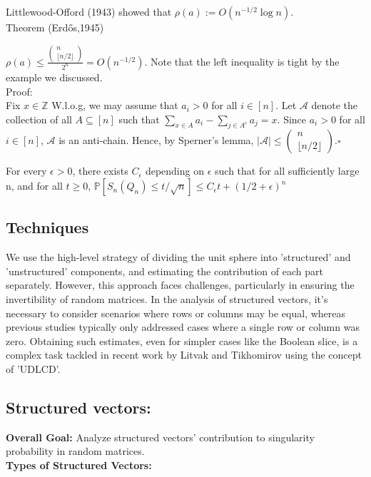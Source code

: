 \documentclass{article}
\begin{document}
Littlewood-Offord (1943) showed that $\rho(a):= O(n^{-1/2}\log{n})$.\\
Theorem (Erd\H{o}s,1945)

$\rho(a) \leq \frac{\left( \begin{array}{c} n \\ {\lfloor n/2 \rfloor} \end{array} \right)
    }{2^n} = O(n^{-1/2})$.
Note that the left inequality is tight by the example we discussed.\\
Proof:\\

Fix $x \in \mathbb{Z}$ W.l.o.g, we may assume that $a_i > 0$ for all $i \in [n].$ Let $\mathcal{A}$ denote the collection of all $A \subseteq [n]$ such that $\sum_{x \in A} a_i - \sum_{j \in A^c} a_j = x$. Since $a_i >0$ for all $i \in [n]$, $\mathcal{A}$ is an anti-chain. Hence, by Sperner's lemma, $|\mathcal{A}| \leq \left( \begin{array}{c} n \\ {\lfloor n/2 \rfloor} \end{array} \right).  \square$

For every $ \epsilon > 0$, there exists $C_\epsilon$ depending on $\epsilon$ such that for all sufficiently large n, and for all $t \geq 0$, $\mathbb{P}[S_n(Q_n)\leq t/\sqrt{n}] \leq C_\epsilon t +(1/2 +\epsilon)^n$
\subsection{Techniques}

We use the high-level strategy of dividing the unit sphere into 'structured' and 'unstructured' components, and estimating the contribution of each part separately.
However, this approach faces challenges, particularly in ensuring the invertibility of random matrices.
In the analysis of structured vectors, it's necessary to consider scenarios where rows or columns may be equal, whereas previous studies typically only addressed cases where a single row or column was zero.
Obtaining such estimates, even for simpler cases like the Boolean slice, is a complex task tackled in recent work by Litvak and Tikhomirov using the concept of 'UDLCD'.

\subsection{Structured vectors:}
\textbf{Overall Goal:} Analyze structured vectors' contribution to singularity probability in random matrices.\\
\textbf{Types of Structured Vectors:}
\end{document}
